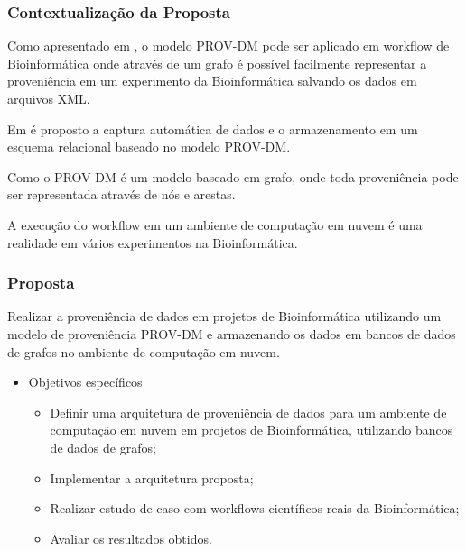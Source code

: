 \documentclass{beamer}
\begin{document}
\begin{frame}
\frametitle{Contextualiza\c{c}\~ao da Proposta}
\begin{block}{}
Como apresentado em \cite{p10}, o modelo PROV-DM pode ser
aplicado em workflow de Bioinform\'atica onde atrav\'es de um grafo
\'e poss\'ivel facilmente representar a proveni\^encia em um
experimento da Bioinform\'atica salvando os dados em arquivos XML.
\end{block}
\begin{block}{}
Em \cite{p18} \'e proposto a captura autom\'atica de
dados e o armazenamento em um esquema relacional baseado no modelo
PROV-DM.
\end{block}
\begin{block}{}
Como o PROV-DM \'e um modelo baseado em grafo, onde toda proveni\^encia
pode ser representada atrav\'es de n\'os e arestas.
\end{block}
\begin{block}{}
A execu\c{c}\~ao do workflow em um ambiente de computa\c{c}\~ao em
nuvem \'e uma realidade em v\'arios experimentos na Bioinform\'atica.
\end{block}
\end{frame}


\begin{frame}
\frametitle{Proposta}
\begin{block}{}
Realizar a proveni\^encia de dados em projetos de Bioinform\'atica
utilizando um modelo de proveni\^encia PROV-DM e armazenando os dados em bancos de dados de grafos no ambiente de computa\c{c}\~ao em nuvem. 
\end{block}
\begin{itemize}
\item Objetivos espec\'ificos
\begin{itemize}
\item Definir uma arquitetura de proveni\^encia de dados para um ambiente de computa\c{c}\~ao em nuvem em projetos de Bioinform\'atica, utilizando bancos de dados de grafos;
\item Implementar a arquitetura proposta;
\item Realizar estudo de caso com workflows cient\'ificos reais da
  Bioinform\'atica;
\item Avaliar os resultados obtidos. 
\end{itemize}
\end{itemize}
\end{frame}
\end{document}
